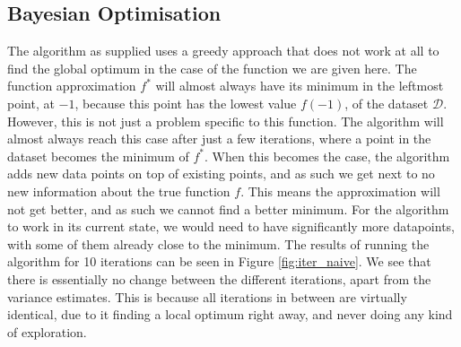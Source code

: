 \subsection{Bayesian Optimisation}
The algorithm as supplied uses a greedy approach that does not work at all to find the global optimum in the case of the function we are given here. The function approximation $f^*$ will almost always have its minimum in the leftmost point, at $-1$, because this point has the lowest value $f(-1)$, of the dataset $\mathcal{D}$. However, this is not just a problem specific to this function. The algorithm will almost always reach this case after just a few iterations, where a point in the dataset becomes the minimum of $f^*$. When this becomes the case, the algorithm adds new data points on top of existing points, and as such we get next to no new information about the true function $f$. This means the approximation will not get better, and as such we cannot find a better minimum. For the algorithm to work in its current state, we would need to have significantly more datapoints, with some of them already close to the minimum. The results of running the algorithm for 10 iterations can be seen in Figure \ref{fig:iter_naive}. We see that there is essentially no change between the different iterations, apart from the variance estimates. This is because all iterations in between are virtually identical, due to it finding a local optimum right away, and never doing any kind of exploration.

